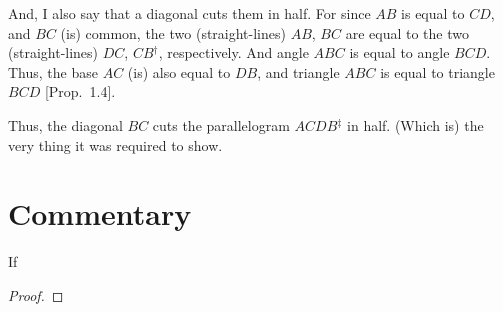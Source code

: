And, I also say that a diagonal cuts them in half. For since $AB$ is equal
to $CD$, and $BC$ (is) common, the two (straight-lines) $AB$, $BC$ are equal
to the two (straight-lines) $DC$, $CB$$^\dag$, respectively. And angle $ABC$ is
equal to angle $BCD$. Thus, the base $AC$ (is) also equal to $DB$, and
triangle $ABC$ is equal to triangle $BCD$ [Prop.~1.4].

Thus, the diagonal $BC$ cuts the parallelogram $ACDB$$^\ddag$ in half. (Which is) the
very thing it was required to show.


\section*{Commentary}

\begin{proposition}\label{proposition_34}\leanok
    If
\end{proposition}
\begin{proof}
    \leanok
\end{proof}

